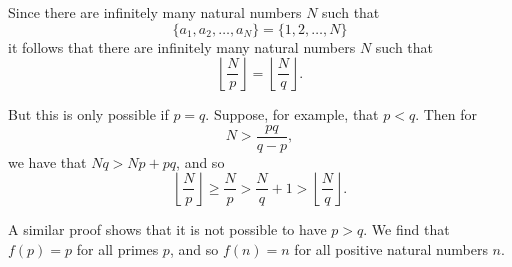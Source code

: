 \documentclass[a4paper,12pt]{article}
\newcommand{\floor}[1]{\ensuremath{\left\lfloor #1 \right\rfloor}}
\begin{document}
\begin{enumerate}
    Since there are infinitely many natural numbers $N$ such that
    \[
        \{a_1, a_2, \ldots, a_N\} = \{1, 2, \ldots, N\}
    \]
    it follows that there are infinitely many natural numbers $N$ such that
    \[
        \floor{\frac{N}{p}} = \floor{\frac{N}{q}}.
    \]

    But this is only possible if $p=q$. Suppose, for example, that $p<q$.
    Then for
    \[
        N > \frac{pq}{q-p},
    \]
    we have that $Nq > Np + pq$, and so
    \[
        \floor{\frac{N}{p}} \geq \frac{N}{p} > \frac{N}{q} + 1 >
        \floor{\frac{N}{q}}.
    \]

    A similar proof shows that it is not possible to have $p > q$. We find
    that $f(p)=p$ for all primes $p$, and so $f(n)=n$ for all positive natural
    numbers $n$.

\end{enumerate}
\end{document}
